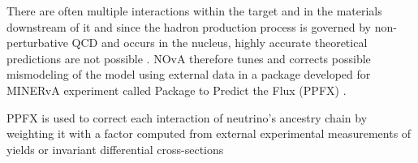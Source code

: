 
\iffalse
There are often multiple interactions within the target and in the materials downstream of it and since the hadron production process is governed by non-perturbative QCD and occurs in the nucleus, highly accurate theoretical predictions are not possible \cite{NuMIFlux.pdf,LEOFluxPredictionAtNuMI.pdf}. NOvA therefore tunes and corrects possible mismodeling of the model using external data in a package developed for MINERvA experiment called Package to Predict the Flux (PPFX) \cite{LEOFluxPredictionAtNuMI.pdf}.



PPFX is used to correct each interaction of neutrino's ancestry chain by weighting it with a factor computed from external experimental measurements of yields or invariant differential cross-sections \cite{LEOFluxPredictionAtNuMI.pdf}

